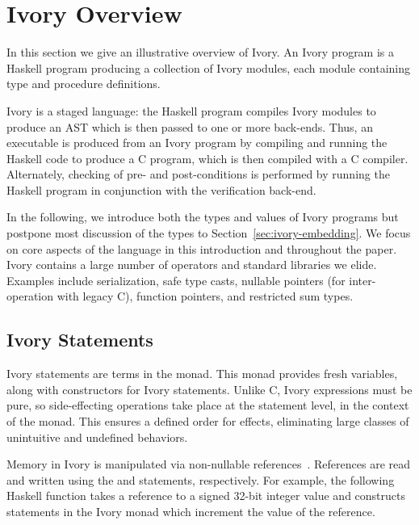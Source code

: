 \section{Ivory Overview}
\label{sec:ivory-overview}


In this section we give an illustrative overview of Ivory.  An Ivory
program is a Haskell program producing a collection of Ivory modules,
each module containing type and procedure definitions.  %

Ivory is a staged language: the Haskell program compiles Ivory modules
to produce an AST which is then passed to one or more back-ends.  Thus,
an executable is produced from an Ivory program by compiling and
running the Haskell code to produce a C program, which is then
compiled with a C compiler.  Alternately, checking of pre- and
post-conditions is performed by running the Haskell program in
conjunction with the verification back-end.

In the following, we introduce both the types and values of Ivory programs but
postpone most discussion of the types to Section~\ref{sec:ivory-embedding}. We
focus on core aspects of the language in this introduction and throughout
the paper. Ivory contains a large number of operators and standard libraries we
elide. Examples include serialization, safe type casts, nullable pointers (for
inter-operation with legacy C), function pointers, and restricted sum types.

\subsection{Ivory Statements}

Ivory statements are terms in the  monad.  This monad
provides fresh variables, along with constructors for Ivory
statements. Unlike C, Ivory expressions must be pure, so
side-effecting operations take place at the statement level, in
the context of the monad. This ensures a defined order for effects,
eliminating large classes of unintuitive and undefined behaviors.

Memory in Ivory is manipulated via non-nullable references~\cite{memareas}.
References are read and written using the  and 
statements, respectively.  For example, the following Haskell function
takes a reference to a signed 32-bit integer value and constructs
statements in the Ivory monad which increment the value of the reference.

